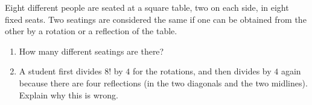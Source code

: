Eight different people are seated at a square table, two on each side, in eight fixed seats. Two seatings are considered the same if one can be obtained from the other by a rotation or a reflection of the table.
\begin{enumerate}
\item[(a)] How many different seatings are there?
\item[(b)] A student first divides $8!$ by $4$ for the rotations, and then divides by $4$ again because there are four reflections (in the two diagonals and the two midlines). Explain why this is wrong.
\end{enumerate}

